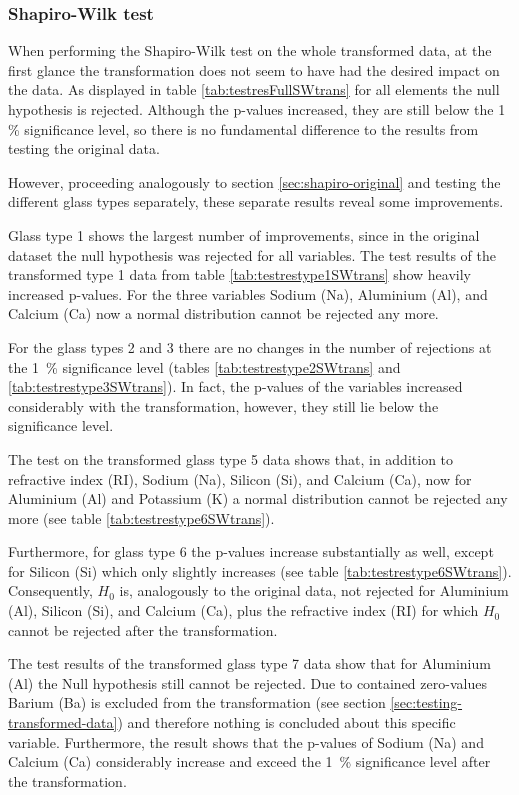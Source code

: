 \documentclass[a4paper, 12pt, titlepage, headsepline, listof = totoc, bibliography = totoc, numbers = noenddot]{scrartcl}
\begin{document}
\subsubsection{Shapiro-Wilk test}\label{sec:shapiro-transformed}

When performing the Shapiro-Wilk test on the whole transformed data, at the first glance the transformation does not seem to have had the desired impact on the data. As displayed in table \ref{tab:testresFullSWtrans} for all elements the null hypothesis is rejected. Although the p-values increased, they are still below the 1\, \% significance level, so there is no fundamental difference to the results from testing the original data.

However, proceeding analogously to section \ref{sec:shapiro-original} and testing the different glass types separately, these separate results reveal some improvements.

Glass type 1 shows the largest number of improvements, since in the original dataset the null hypothesis was rejected for all variables. The test results of the transformed type 1 data from table \ref{tab:testrestype1SWtrans} show heavily increased p-values. For the three variables Sodium (Na), Aluminium (Al), and Calcium (Ca) now a normal distribution cannot be rejected any more.

For the glass types 2 and 3 there are no changes in the number of rejections at the 1\, \% significance level (tables \ref{tab:testrestype2SWtrans} and \ref{tab:testrestype3SWtrans}). In fact, the p-values of the variables increased considerably with the transformation, however, they still lie below the significance level.

The test on the transformed glass type 5 data shows that, in addition to refractive index (RI), Sodium (Na), Silicon (Si), and Calcium (Ca), now for Aluminium (Al) and Potassium (K) a normal distribution cannot be rejected any more (see table \ref{tab:testrestype6SWtrans}).

Furthermore, for glass type 6 the p-values increase substantially as well, except for Silicon (Si) which only slightly increases (see table \ref{tab:testrestype6SWtrans}). Consequently, $H_0$ is, analogously to the original data, not rejected for Aluminium (Al), Silicon (Si), and Calcium (Ca), plus the refractive index (RI) for which $H_0$ cannot be rejected after the transformation.

The test results of the transformed glass type 7 data show that for Aluminium (Al) the Null hypothesis still cannot be rejected. Due to contained zero-values Barium (Ba) is excluded from the transformation (see section \ref{sec:testing-transformed-data}) and therefore nothing is concluded about this specific variable. Furthermore, the result shows that the p-values of Sodium (Na) and Calcium (Ca) considerably increase and exceed the 1\, \% significance level after the transformation.
\end{document}
